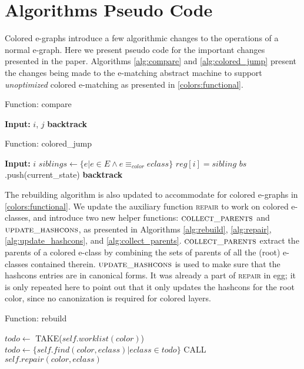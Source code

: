 \chapter{Algorithms Pseudo Code}
\label{app:algorithms}

Colored e-graphs introduce a few algorithmic changes to the operations of a normal e-graph.
Here we present pseudo code for the important changes presented in the paper.
Algorithms \ref{alg:compare} and \ref{alg:colored_jump} present the changes being made to the e-matching abstract machine to support \emph{unoptimized} colored e-matching as presented in \autoref{colors:functional}.

\begin{algorithm}
\caption{Function: compare}
\label{alg:compare}
\begin{algorithmic}
\STATE \textbf{Input:} $i$, $j$
    \STATE \textbf{backtrack}
\ENDIF
\end{algorithmic}
\end{algorithm}

\begin{algorithm}
\caption{Function: colored\_jump}
\label{alg:colored_jump}
\begin{algorithmic}
\STATE \textbf{Input:} $i$
\STATE $siblings \gets \{e | e \in E \land e \equiv_{color} eclass\}$
    \STATE $reg[i] = sibling$
    \STATE $bs$.push(current\_state)
\ENDFOR
\STATE \textbf{backtrack}
\end{algorithmic}
\end{algorithm}

The rebuilding algorithm is also updated to accommodate for colored e-graphs in \autoref{colors:functional}.
We update the auxiliary function \textsc{repair} to work on colored e-classes,
and introduce two new helper functions: $\textsc{collect\_parents}$ and $\textsc{update\_hashcons}$, as presented in Algorithms \ref{alg:rebuild}, \ref{alg:repair}, \ref{alg:update_hashcons}, and \ref{alg:collect_parents}.
$\textsc{collect\_parents}$ extract the parents of a colored e-class by combining the sets of parents of all the (root) e-classes contained therein.
$\textsc{update\_hashcons}$ is used to make sure that the hashcons entries are in canonical forms. It was already a part of \textsc{repair} in egg;
it is only repeated here to point out that it
only updates the hashcons for the root color,
since no canonization is required for colored layers.    

\begin{algorithm}
\caption{Function: rebuild}
\label{alg:rebuild}
\begin{algorithmic}
        \STATE $todo \gets$ TAKE($self.worklist(color)$)
        \STATE $todo \gets \{ self.find(color, eclass) | eclass \in todo \}$
            \STATE CALL $self.repair(color, eclass)$
        \ENDFOR
    \ENDWHILE
\ENDFOR
\end{algorithmic}
\end{algorithm}

